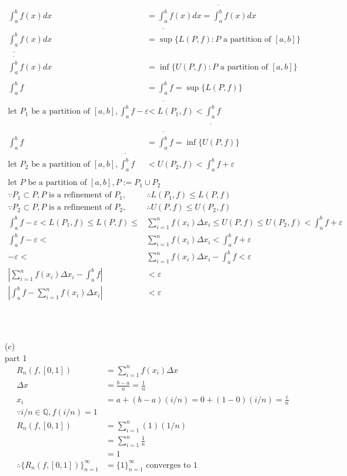 \documentclass[12pt, border = 4pt, multi]{article} %
\begin{document}
\begin{align*}
\int_a ^ b f(x) dx &=  \underline{\int_a ^ b}f(x)dx = \overline{\int_a ^ b}f(x)dx\\
\underline{\int_a ^ b}f(x)dx &= \sup\{L(P, f): P \text{ a partition of }[a, b]\}\\
\overline{\int_a ^ b}f(x)dx &= \inf\{U(P, f): P \text{ a partition of }[a, b]\}\\
\\
\int_a ^ b f &= \underline{\int_a ^ b} f = \sup\{L(P, f)\}\\
\text{let } P_1 \text{ be a partition of }[a, b], \int_a ^ b f - \varepsilon &< L(P_1, f) < \underline{\int_a ^ b} f\\
\\
\int_a ^ b f &= \overline{\int_a ^ b} f = \inf\{U(P, f)\}\\
\text{let } P_2 \text{ be a partition of }[a, b], \overline{\int_a ^ b} f &< U(P_2, f) < \int_a ^ b f + \varepsilon\\
\\
\text{let } P \text{ be a partition of }[a, b], P := P_1 \cup P_2\\
\because P_1 \subset P, P \text{ is a refinement of } P_1, &\therefore L(P_1, f) \leq L(P, f)\\
\because P_2 \subset P, P \text{ is a refinement of } P_2, &\therefore U(P, f) \leq U(P_2, f)\\
\int_a ^ b f - \varepsilon < L(P_1, f) \leq L(P, f) \leq &\sum_{i = 1} ^ n f(x_i)\Delta x_i \leq U(P, f) \leq U(P_2, f) < \int_a ^ b f + \varepsilon\\
\int_a ^ b f - \varepsilon < &\sum_{i = 1} ^ n f(x_i)\Delta x_i < \int_a ^ b f + \varepsilon\\
- \varepsilon < &\sum_{i = 1} ^ n f(x_i)\Delta x_i - \int_a ^ b f < \varepsilon\\
\left|\sum_{i = 1} ^ n f(x_i)\Delta x_i - \int_a ^ b f\right| &< \varepsilon\\
\left|\int_a ^ b f - \sum_{i = 1} ^ n f(x_i)\Delta x_i\right| &< \varepsilon\\
\end{align*}
\\
\\
\\
(c)\\
part 1
\begin{align*}
R_n(f, [0, 1]) &= \sum_{i = 1} ^ n f(x_i) \Delta x\\
\Delta x &= \frac{b - a}{n} = \frac{1}{n}\\
x_i &= a + (b - a)(i / n) = 0 + (1 - 0)(i / n) = \frac{i}{n}\\
\because i / n \in \mathbb{Q}, f(i / n) = 1\\
R_n(f, [0, 1]) &= \sum_{i = 1} ^ n (1)(1 / n)\\
&= \sum_{i = 1} ^ n \frac{1}{n}\\
&= 1\\
\therefore \{R_n(f, [0, 1])\}_{n = 1} ^ {\infty} &= \{1\}_{n = 1} ^ {\infty} \text{ converges to 1}\\
\end{align*}
\end{document}
